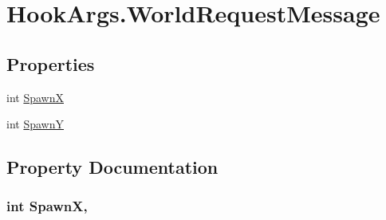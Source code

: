 \hypertarget{structOTA_1_1Plugin_1_1HookArgs_1_1WorldRequestMessage}{}\section{Hook\+Args.\+World\+Request\+Message}
\label{structOTA_1_1Plugin_1_1HookArgs_1_1WorldRequestMessage}
\subsection*{Properties}
\begin{DoxyCompactItemize}
\item 
int \hyperlink{structOTA_1_1Plugin_1_1HookArgs_1_1WorldRequestMessage_a4941c398b45da2c64bf19c86a93758b0}{Spawn\+X}
\item 
int \hyperlink{structOTA_1_1Plugin_1_1HookArgs_1_1WorldRequestMessage_a23f27a069556fb8443d56c38a6d0c711}{Spawn\+Y}
\end{DoxyCompactItemize}


\subsection{Property Documentation}
\hypertarget{structOTA_1_1Plugin_1_1HookArgs_1_1WorldRequestMessage_a4941c398b45da2c64bf19c86a93758b0}{}
\subsubsection[{Spawn\+X}]{\setlength{\rightskip}{0pt plus 5cm}int Spawn\+X\hspace{0.3cm}{\ttfamily [get]}, {\ttfamily [set]}}\label{structOTA_1_1Plugin_1_1HookArgs_1_1WorldRequestMessage_a4941c398b45da2c64bf19c86a93758b0}
\hypertarget{structOTA_1_1Plugin_1_1HookArgs_1_1WorldRequestMessage_a23f27a069556fb8443d56c38a6d0c711}{}
